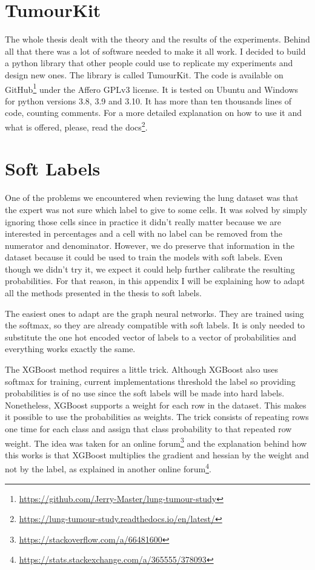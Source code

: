 \chapter{TumourKit}

The whole thesis dealt with the theory and the results of the experiments. Behind all that there was a lot of software needed to make it all work. I decided to build a python library that other people could use to replicate my experiments and design new ones. The library is called TumourKit. The code is available on GitHub\footnote{\url{https://github.com/Jerry-Master/lung-tumour-study}} under the Affero GPLv3 license. It is tested on Ubuntu and Windows for python versions 3.8, 3.9 and 3.10. It has more than ten thousands lines of code, counting comments. For a more detailed explanation on how to use it and what is offered, please, read the docs\footnote{\url{https://lung-tumour-study.readthedocs.io/en/latest/}}.

\chapter{Soft Labels}

One of the problems we encountered when reviewing the lung dataset was that the expert was not sure which label to give to some cells. It was solved by simply ignoring those cells since in practice it didn't really matter because we are interested in percentages and a cell with no label can be removed from the numerator and denominator. However, we do preserve that information in the dataset because it could be used to train the models with soft labels. Even though we didn't try it, we expect it could help further calibrate the resulting probabilities. For that reason, in this appendix I will be explaining how to adapt all the methods presented in the thesis to soft labels. 

The easiest ones to adapt are the graph neural networks. They are trained using the softmax, so they are already compatible with soft labels. It is only needed to substitute the one hot encoded vector of labels to a vector of probabilities and everything works exactly the same.

The XGBoost method requires a little trick. Although XGBoost also uses softmax for training, current implementations threshold the label so providing probabilities is of no use since the soft labels will be made into hard labels. Nonetheless, XGBoost supports a weight for each row in the dataset. This makes it possible to use the probabilities as weights. The trick consists of repeating rows one time for each class and assign that class probability to that repeated row weight. The idea was taken for an online forum\footnote{\url{https://stackoverflow.com/a/66481600}} and the explanation behind how this works is that XGBoost multiplies the gradient and hessian by the weight and not by the label, as explained in another online forum\footnote{\url{https://stats.stackexchange.com/a/365555/378093}}. 

